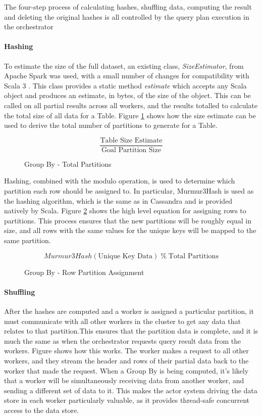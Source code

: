 The four-step process of calculating hashes, shuffling data, computing the result and deleting the original hashes is all controlled by the query plan execution in the orchestrator

\paragraph{Hashing} To estimate the size of the full dataset, an existing class, \textit{SizeEstimator}, from Apache Spark was used, with a small number of changes for compatibility with Scala 3 . This class provides a static method \textit{estimate} which accepts any Scala object and produces an estimate, in bytes, of the size of the object. This can be called on all partial results across all workers, and the results totalled to calculate the total size of all data for a Table. Figure \ref{fig:group-by-num-partitions} shows how the size estimate can be used to derive the total number of partitions to generate for a Table.

\begin{figure}[h]
	\centering
	\[ \frac{\text{Table Size Estimate}}{\text{Goal Partition Size}} \]
	\caption{Group By - Total Partitions}
	\label{fig:group-by-num-partitions}
\end{figure}

Hashing, combined with the modulo operation, is used to determine which partition each row should be assigned to. In particular, Murmur3Hash is used as the hashing algorithm, which is the same as in Cassandra and is provided natively by Scala. Figure \ref{fig:group-by-partition-assign} shows the high level equation for assigning rows to partitions. This process ensures that the new partitions will be roughly equal in size, and all rows with the same values for the unique keys will be mapped to the same partition.
 
\begin{figure}[h]
	\centering
	\[ Murmur3Hash(\text{Unique Key Data}) \; \%  \; \text{Total Partitions} \]
	\caption{Group By - Row Partition Assignment}
	\label{fig:group-by-partition-assign}
\end{figure} 

\paragraph{Shuffling}
After the hashes are computed and a worker is assigned a particular partition, it must communicate with all other workers in the cluster to get any data that relates to that partition.This ensures that the partition data is complete, and it is much the same as when the orchestrator requests query result data from the workers. Figure  shows how this works. The worker makes a request to all other workers, and they stream the header and rows of their partial data back to the worker that made the request. When a Group By is being computed, it's likely that a worker will be simultaneously receiving data from another worker, and sending a different set of data to it. This makes the actor system driving the data store in each worker particularly valuable, as it provides thread-safe concurrent access to the data store.

